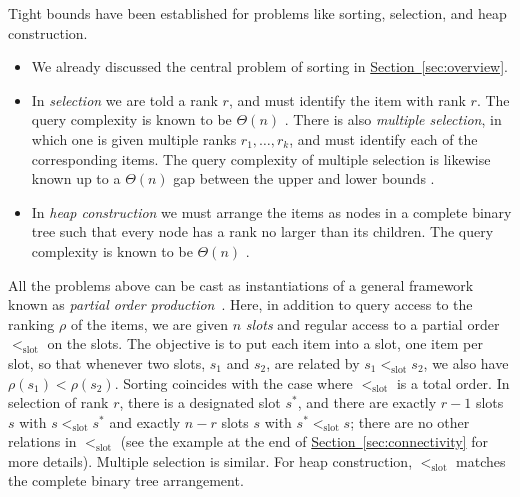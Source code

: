 \documentclass[11pt]{article}
\numberwithin{equation}{section}
\theoremstyle{definition}
\theoremstyle{plain}
\newcommand{\expref}[2]{\hyperref[#2]{#1~\ref{#2}}}
\newcommand{\slotorder}{<_\mathrm{slot}}
\newcommand{\ranking}{\rho}
\begin{document}
Tight bounds have been established for problems like sorting, selection, and heap construction. 
\begin{itemize}
 \item We already discussed the central problem of sorting in \expref{Section}{sec:overview}.
 \item In \emph{selection} we are told a rank $r$, and must identify the item with rank $r$. The query complexity is known to be $\Theta(n)$ \cite{BFPRT1973,DorZwick1995,DorZwick1996}. There is also \emph{multiple selection}, in which one is given multiple ranks $r_1,\dots,r_k$, and must identify each of the corresponding items. 
 The query complexity of multiple selection is likewise known up to a $\Theta(n)$ gap between the upper and lower bounds \cite{KMMS2005}.
 \item In \emph{heap construction} we must arrange the items as nodes in a complete binary tree such that every node has a rank no larger than its children. The query complexity is known to be $\Theta(n)$ \cite{CC92,GM86}. 
\end{itemize}

All the problems above can be cast as instantiations of a general framework known as \emph{partial order production}~\cite{Schoenhage1976}. Here, in addition to query access to the ranking $\ranking$ of the items, we are given $n$ \emph{slots} and regular access to a partial order $\slotorder$ on the slots. The objective is to put each item into a slot, one item per slot, so that whenever two slots, $s_1$ and $s_2$, are related by $s_1 \slotorder s_2$, we also have $\ranking(s_1) < \ranking(s_2)$. Sorting coincides with the case where $\slotorder$ is a total order. In selection of rank $r$, there is a designated slot $s^*$, and there are exactly $r-1$ slots $s$ with $s \slotorder s^*$ and exactly $n-r$ slots $s$ with $s^* \slotorder s$; there are no other relations in $\slotorder$ (see the example at the end of \expref{Section}{sec:connectivity} for more details).  Multiple selection is similar. For heap construction, $\slotorder$ matches the complete binary tree arrangement. 
\end{document}
